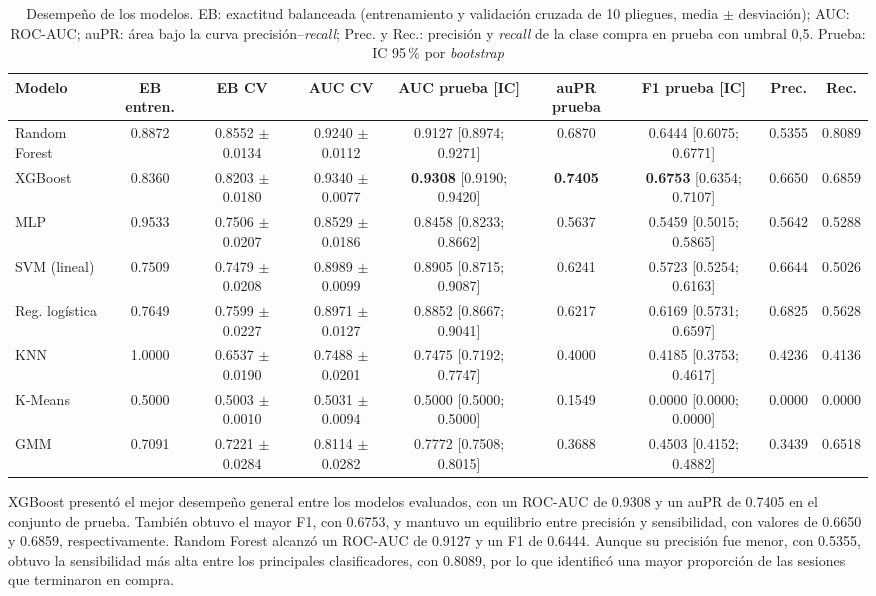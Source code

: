 \documentclass[conference]{IEEEtran}
\begin{document}
\begin{table}[!t]
\centering
\caption{Desempeño de los modelos. EB: exactitud balanceada (entrenamiento y validación cruzada de 10 pliegues, media $\pm$ desviación); AUC: ROC-AUC; auPR: área bajo la curva precisión--\emph{recall}; Prec. y Rec.: precisión y \emph{recall} de la clase compra en prueba con umbral 0,5. Prueba: IC 95\,\% por \emph{bootstrap}}
\label{tab:res}
\scriptsize
\setlength{\tabcolsep}{3.5pt}
\begin{tabular}{@{}lcccccccc@{}}
\toprule
Modelo & EB entren. & EB CV & AUC CV & AUC prueba [IC] & auPR prueba & F1 prueba [IC] & Prec. & Rec. \\
\midrule
Random Forest & 0.8872 & 0.8552 $\pm$ 0.0134 & 0.9240 $\pm$ 0.0112 & 0.9127 [0.8974; 0.9271] & 0.6870 & 0.6444 [0.6075; 0.6771] & 0.5355 & 0.8089 \\
XGBoost & 0.8360 & 0.8203 $\pm$ 0.0180 & 0.9340 $\pm$ 0.0077 & \textbf{0.9308} [0.9190; 0.9420] & \textbf{0.7405} & \textbf{0.6753} [0.6354; 0.7107] & 0.6650 & 0.6859 \\
MLP & 0.9533 & 0.7506 $\pm$ 0.0207 & 0.8529 $\pm$ 0.0186 & 0.8458 [0.8233; 0.8662] & 0.5637 & 0.5459 [0.5015; 0.5865] & 0.5642 & 0.5288 \\
SVM (lineal) & 0.7509 & 0.7479 $\pm$ 0.0208 & 0.8989 $\pm$ 0.0099 & 0.8905 [0.8715; 0.9087] & 0.6241 & 0.5723 [0.5254; 0.6163] & 0.6644 & 0.5026 \\
Reg. logística & 0.7649 & 0.7599 $\pm$ 0.0227 & 0.8971 $\pm$ 0.0127 & 0.8852 [0.8667; 0.9041] & 0.6217 & 0.6169 [0.5731; 0.6597] & 0.6825 & 0.5628 \\
KNN & 1.0000 & 0.6537 $\pm$ 0.0190 & 0.7488 $\pm$ 0.0201 & 0.7475 [0.7192; 0.7747] & 0.4000 & 0.4185 [0.3753; 0.4617] & 0.4236 & 0.4136 \\
K-Means & 0.5000 & 0.5003 $\pm$ 0.0010 & 0.5031 $\pm$ 0.0094 & 0.5000 [0.5000; 0.5000] & 0.1549 & 0.0000 [0.0000; 0.0000] & 0.0000 & 0.0000 \\
GMM & 0.7091 & 0.7221 $\pm$ 0.0284 & 0.8114 $\pm$ 0.0282 & 0.7772 [0.7508; 0.8015] & 0.3688 & 0.4503 [0.4152; 0.4882] & 0.3439 & 0.6518 \\
\bottomrule
\end{tabular}
\end{table}

XGBoost presentó el mejor desempeño general entre los modelos evaluados, con un ROC-AUC de 0.9308 y un auPR de 0.7405 en el conjunto de prueba. También obtuvo el mayor F1, con 0.6753, y mantuvo un equilibrio entre precisión y sensibilidad, con valores de 0.6650 y 0.6859, respectivamente. Random Forest alcanzó un ROC-AUC de 0.9127 y un F1 de 0.6444. Aunque su precisión fue menor, con 0.5355, obtuvo la sensibilidad más alta entre los principales clasificadores, con 0.8089, por lo que identificó una mayor proporción de las sesiones que terminaron en compra.
\end{document}
